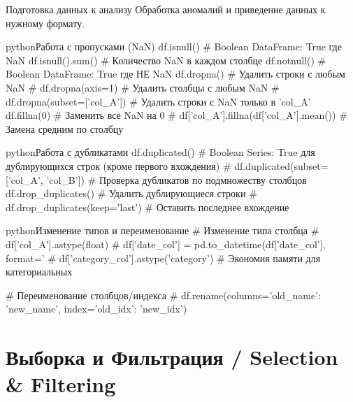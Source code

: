 \begin{textbox}{Подготовка данных к анализу}
Обработка аномалий и приведение данных к нужному формату.

\begin{codebox}{python}{Работа с пропусками (NaN)}
df.isnull()      # Boolean DataFrame: True где NaN
df.isnull().sum() # Количество NaN в каждом столбце
df.notnull()     # Boolean DataFrame: True где НЕ NaN
df.dropna()      # Удалить строки с любым NaN
# df.dropna(axis=1) # Удалить столбцы с любым NaN
# df.dropna(subset=['col_A']) # Удалить строки с NaN только в 'col_A'
df.fillna(0)     # Заменить все NaN на 0
# df['col_A'].fillna(df['col_A'].mean()) # Замена средним по столбцу
\end{codebox}

\begin{codebox}{python}{Работа с дубликатами}
df.duplicated() # Boolean Series: True для дублирующихся строк (кроме первого вхождения)
# df.duplicated(subset=['col_A', 'col_B']) # Проверка дубликатов по подмножеству столбцов
df.drop_duplicates() # Удалить дублирующиеся строки
# df.drop_duplicates(keep='last') # Оставить последнее вхождение
\end{codebox}

\begin{codebox}{python}{Изменение типов и переименование}
# Изменение типа столбца
# df['col_A'].astype(float)
# df['date_col'] = pd.to_datetime(df['date_col'], format='%
# df['category_col'].astype('category') # Экономия памяти для категориальных

# Переименование столбцов/индекса
# df.rename(columns={'old_name': 'new_name'}, index={'old_idx': 'new_idx'})
\end{codebox}
\end{textbox}

\section{Выборка и Фильтрация / Selection \& Filtering}

